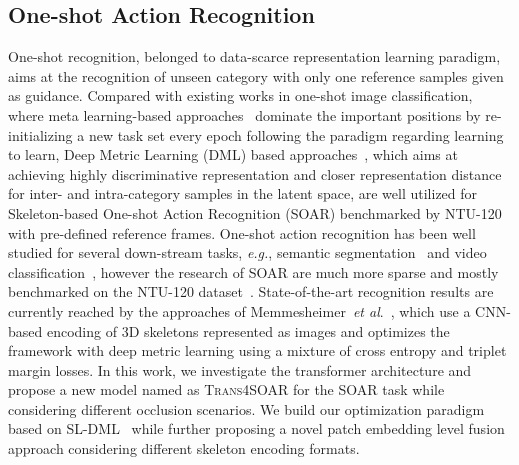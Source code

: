 \documentclass[lettersize,journal]{IEEEtran}
\newcommand{\etal}{\textit{et al}.}
\begin{document}
\subsection{One-shot Action Recognition}
One-shot recognition, belonged to data-scarce representation learning paradigm, aims at the recognition of unseen category with only one reference samples given as guidance.
Compared with existing works in one-shot image classification, where meta learning-based approaches~\cite{zou2020adaptation,xue2020one,tsutsui2019meta,hu2022pushing,hu2022squeezing,bendou2022easy} dominate the important positions by re-initializing a new task set every epoch following the paradigm regarding learning to learn, Deep Metric Learning (DML) based approaches~\cite{memmesheimer2020skeleton_dml,memmesheimer2021sl,zou2018hierarchical}, which aims at achieving highly discriminative representation and closer representation distance for inter- and intra-category samples in the latent space, are well utilized for Skeleton-based One-shot Action Recognition (SOAR) benchmarked by NTU-120~\cite{liu2019ntu} with pre-defined reference frames. 
One-shot action recognition has been well studied for several down-stream tasks, \textit{e.g.}, semantic segmentation~\cite{zhang2021trans4trans_iccvw} and video classification~\cite{cao2021fewshot,hong2021video_pose_distillation,patravali2021metauvfs,wang2021semantic_guided}, however the research of SOAR are much more sparse and mostly benchmarked on the NTU-120 dataset~\cite{liu2019ntu,memmesheimer2020skeleton_dml,sabater2021one,liu2017skeleton,liu2017global}.
State-of-the-art recognition results are currently reached by the approaches of Memmesheimer~\etal~\cite{memmesheimer2021sl, memmesheimer2020skeleton_dml}, which use a CNN-based encoding of 3D skeletons represented as images and optimizes the framework with deep metric learning using a mixture of cross entropy and triplet margin losses.
In this work, we investigate the transformer architecture and propose a new model named as \textsc{Trans4SOAR} for the SOAR task while considering different occlusion scenarios. We build our optimization paradigm based on SL-DML~\cite{memmesheimer2020skeleton_dml} while further proposing a novel patch embedding level fusion approach considering different skeleton encoding formats.
\end{document}
